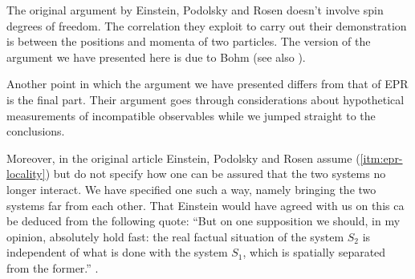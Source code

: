\begin{observation}
  The original argument by Einstein, Podolsky and Rosen \cite{PhysRev.47.777} doesn't involve spin degrees of freedom. The correlation they exploit to carry out their demonstration is between the positions and momenta of two particles. The version of the argument we have presented here is due to Bohm \cite{bohm1951quantum} (see also \cite{PhysRev.108.1070}).

  Another point in which the argument we have presented differs from that of EPR is the final part. Their argument goes through considerations about hypothetical measurements of incompatible observables while we jumped straight to the conclusions.

  Moreover, in the original article Einstein, Podolsky and Rosen assume (\ref{itm:epr-locality}) but do not specify how one can be assured that the two systems no longer interact. We have specified one such a way, namely bringing the two systems far from each other. That Einstein would have agreed with us on this ca be deduced from the following quote: ``But on one supposition we should, in my opinion, absolutely hold fast: the real factual situation of the system $S_2$ is independent of what is done with the system $S_1$, which is spatially separated from the former.'' \cite{schilpp1949albert}.
\end{observation}
